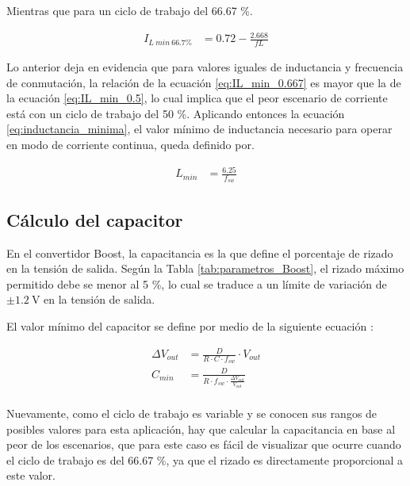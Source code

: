 \documentclass[conference]{IEEEtran}
\begin{document}
Mientras que para un ciclo de trabajo del 66.67 \%.

\begin{equation}
\begin{aligned}
    I_{L~min~66.7 \%} &= 0.72 - \frac{2.668}{fL}
\end{aligned}
\label{eq:IL_min_0.667}
\end{equation}

Lo anterior deja en evidencia que para valores iguales de inductancia y frecuencia de
conmutación, la relación de la ecuación \ref{eq:IL_min_0.667} es mayor que la de la ecuación \ref{eq:IL_min_0.5}, 
lo cual implica que el peor escenario de corriente está con un ciclo de trabajo del 50 \%. Aplicando
entonces la ecuación \ref{eq:inductancia_minima}, el valor mínimo de inductancia necesario
para operar en modo de corriente continua, queda definido por.

\begin{equation}
\begin{aligned}
    L_{min} &= \frac{6.25}{f_{sw}}
\end{aligned}
\label{eq:inductancia_minima_num}
\end{equation}


\subsection{Cálculo del capacitor}
En el convertidor Boost, la capacitancia es la que define el porcentaje de rizado
en la tensión de salida. Según la Tabla \ref{tab:parametros_Boost}, el rizado máximo permitido debe se menor
al 5 \%, lo cual se traduce a un límite de variación de $\pm 1.2~\mathrm{V}$ en la tensión de salida.

El valor mínimo del capacitor se define por medio de la siguiente ecuación \cite{hart2011power}:

\begin{equation}
\begin{aligned}
     \Delta V_{out} &=  \frac{D}{R\cdot C\cdot f_{sw}} \cdot V_{out} \\
    C_{min}         &= \frac{D}{R \cdot f_{sw} \cdot \frac{\Delta V_{out}}{V_{out}}} \\
\end{aligned}
\label{eq:capacitancia_minima}
\end{equation}

Nuevamente, como el ciclo de trabajo es variable y se conocen sus rangos de posibles valores para esta aplicación, 
hay que calcular la capacitancia en base al peor de los escenarios, que para este caso es fácil de visualizar que ocurre
cuando el ciclo de trabajo es del 66.67 \%, ya que el rizado es directamente proporcional a este valor. 
\end{document}
